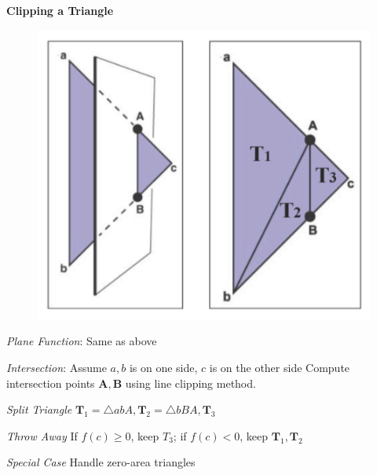 \documentclass[letterpaper, 8pt]{extarticle}
\begin{document}
\begin{multicols*}{4}
\textbf{Clipping a Triangle}
\begin{figure}
    \includegraphics[width=\linewidth]{triangle-clipping.png}
\end{figure}

\textit{Plane Function}:
Same as above

\textit{Intersection}:
Assume \(a, b\) is on one side, \(c\) is on the other side
Compute intersection points \(\mathbf{A}, \mathbf{B}\) using line clipping method.

\textit{Split Triangle}
\(\mathbf{T}_1=\triangle abA, \mathbf{T}_2=\triangle bBA, \mathbf{T}_3\)

\textit{Throw Away}
If \(f(c) \geq 0\), keep \(T_3\); if \(f(c) < 0\), keep \(\mathbf{T}_1, \mathbf{T}_2\)

\textit{Special Case}
Handle zero-area triangles

\end{multicols*}
\end{document}

